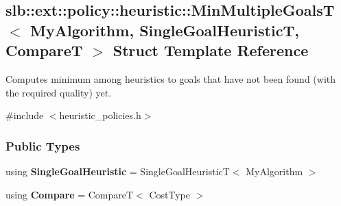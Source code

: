 \hypertarget{structslb_1_1ext_1_1policy_1_1heuristic_1_1MinMultipleGoalsT}{}\subsection{slb\+:\+:ext\+:\+:policy\+:\+:heuristic\+:\+:Min\+Multiple\+GoalsT$<$ My\+Algorithm, Single\+Goal\+HeuristicT, CompareT $>$ Struct Template Reference}
\label{structslb_1_1ext_1_1policy_1_1heuristic_1_1MinMultipleGoalsT}


Computes minimum among heuristics to goals that have not been found (with the required quality) yet.  




{\ttfamily \#include $<$heuristic\+\_\+policies.\+h$>$}

\subsubsection*{Public Types}
\begin{DoxyCompactItemize}
\item 
using {\bfseries Single\+Goal\+Heuristic} = Single\+Goal\+HeuristicT$<$ My\+Algorithm $>$\hypertarget{structslb_1_1ext_1_1policy_1_1heuristic_1_1MinMultipleGoalsT_ae0deabd1bd117ed3fdbb2f0859d0efb6}{}\label{structslb_1_1ext_1_1policy_1_1heuristic_1_1MinMultipleGoalsT_ae0deabd1bd117ed3fdbb2f0859d0efb6}

\item 
using {\bfseries Compare} = CompareT$<$ Cost\+Type $>$\hypertarget{structslb_1_1ext_1_1policy_1_1heuristic_1_1MinMultipleGoalsT_ab3927fe6fcb6244f22c75357df3fd4e6}{}\label{structslb_1_1ext_1_1policy_1_1heuristic_1_1MinMultipleGoalsT_ab3927fe6fcb6244f22c75357df3fd4e6}

\end{DoxyCompactItemize}
